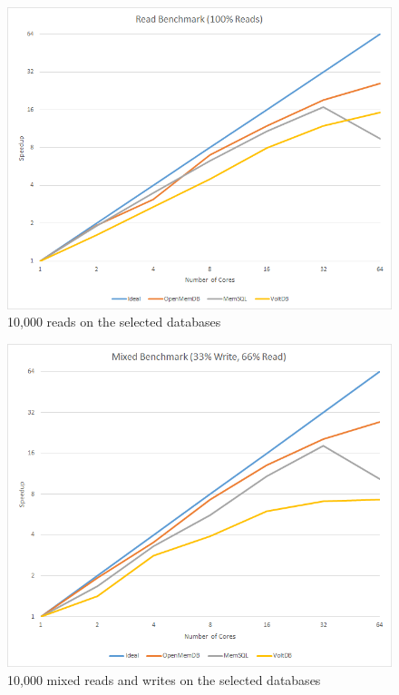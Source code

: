 \documentclass[conference, compsoc]{IEEEtran}
\begin{document}
\begin{figure}[H]
   \begin{center}
   \includegraphics[scale=.5]{ReadBenchmark.png}
  \caption{10,000 reads on the selected databases}
  \label{fig:readBenchmark}
   \end{center}
\end{figure}

\begin{figure}[H]
 \begin{center}
   \includegraphics[scale=.35]{MixedBenchmark.png}
  \caption{10,000 mixed reads and writes on the selected databases}
  \label{fig:mixedBenchmark}
   \end{center}
\end{figure}
\end{document}
